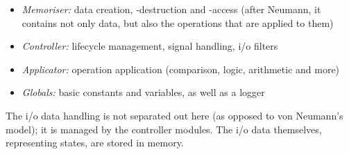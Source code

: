 \begin{itemize}
    \item \emph{Memoriser:} data creation, -destruction and -access (after
        Neumann, it contains not only data, but also the operations that are
        applied to them)
    \item \emph{Controller:} lifecycle management, signal handling, i/o filters
    \item \emph{Applicator:} operation application (comparison, logic,
        arithmetic and more)
    \item \emph{Globals:} basic constants and variables, as well as a logger
\end{itemize}

The i/o data handling is not separated out here (as opposed to von Neumann's
model); it is managed by the controller modules. The i/o data themselves,
representing states, are stored in memory.
